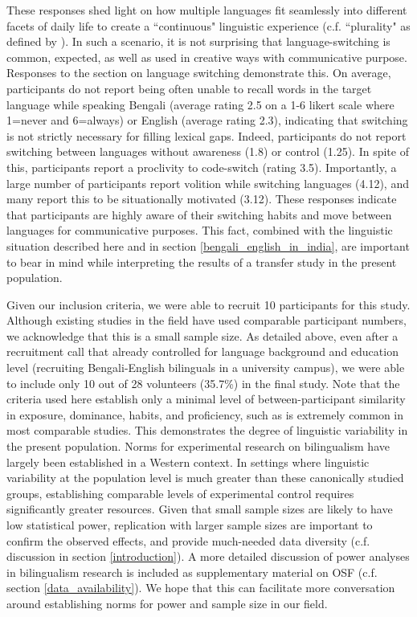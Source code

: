 \documentclass[12 pt]{article}
\begin{document}
These responses shed light on how multiple languages fit seamlessly into different facets of daily life to create a ``continuous" linguistic experience (c.f. ``plurality" as defined by \cite{khubchandani2021plural}). In such a scenario, it is not surprising that language-switching is common, expected, as well as used in creative ways with communicative purpose. Responses to the section on language switching demonstrate this. On average, participants do not report being often unable to recall words in the target language while speaking Bengali (average rating 2.5 on a 1-6 likert scale where 1=never and 6=always) or English (average rating 2.3), indicating that switching is not strictly necessary for filling lexical gaps. Indeed, participants do not report switching between languages without awareness (1.8) or control (1.25). In spite of this, participants report a proclivity to code-switch (rating 3.5). Importantly, a large number of participants report volition while switching languages (4.12), and many report this to be situationally motivated (3.12). These responses indicate that participants are highly aware of their switching habits and move between languages for communicative purposes. This fact, combined with the linguistic situation described here and in section \ref{bengali_english_in_india}, are important to bear in mind while interpreting the results of a transfer study in the present population. 

Given our inclusion criteria, we were able to recruit 10 participants for this study. Although existing studies in the field have used comparable participant numbers, we acknowledge that this is a small sample size. As detailed above, even after a recruitment call that already controlled for language background and education level (recruiting Bengali-English bilinguals in a university campus), we were able to include only 10 out of 28 volunteers (35.7\%) in the final study. Note that the criteria used here establish only a minimal level of between-participant similarity in exposure, dominance, habits, and proficiency, such as is extremely common in most comparable studies. This demonstrates the degree of linguistic variability in the present population. Norms for experimental research on bilingualism have largely been established in a Western context. In settings where linguistic variability at the population level is much greater than these canonically studied groups, establishing comparable levels of experimental control requires significantly greater resources. Given that small sample sizes are likely to have low statistical power, replication with larger sample sizes are important to confirm the observed effects, and provide much-needed data diversity (c.f. discussion in section \ref{introduction}). A more detailed discussion of power analyses in bilingualism research is included as supplementary material on OSF (c.f. section \ref{data_availability}). We hope that this can facilitate more conversation around establishing norms for power and sample size in our field.  




\end{document}
